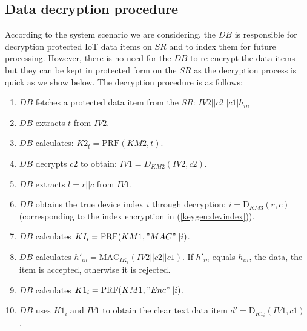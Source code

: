 {\subsection{Data decryption procedure}
\label{dataprotection:decryption}
According to the system scenario we are considering, the $DB$ is responsible for decryption protected IoT data items on $SR$ and to index them for future processing. However, there is no need for the $DB$ to re-encrypt the data items but they can be kept in protected form on the $SR$ as the decryption process is quick as we show below.
The decryption procedure is as follows:
\begin{enumerate}
    \item $DB$ fetches a protected data item from the $SR$:  $IV2||c2||c1|h_{in}$
    \item $DB$ extracts $t$ from $IV2$.
    \item $DB$ calculates: $K2_t = \text{PRF}(KM2,t)$.
    \item $DB$ decrypts $c2$ to obtain: $IV1 = D_{KM2}(IV2,c2)$.
    \item $DB$ extracts $l = r||c$ from $IV1$.
    \item $DB$ obtains the true device index $i$ through decryption: $i = \text{D}_{KM3}(r,c)$ (corresponding to the index encryption in (\ref{keygen:devindex})).
    \item $DB$ calculates $KI_i = \text{PRF}(KM1,"MAC"||i)$.
     \item $DB$ calculates $h'_{in} = \text{MAC}_{IK_i}(IV2||c2||c1)$. If $h'_{in}$ equals $h_{in}$, the data, the item is accepted, otherwise it is rejected.
    \item $DB$ calculates $K1_i = \text{PRF}(KM1,"Enc"||i)$.
    \item $DB$ uses $K1_i$ and $IV1$ to obtain the clear text data item $d' = \text{D}_{K1_i}(IV1,c1)$ .
    
    
\end{enumerate}

\graphicspath{{analysis/images/}}
}
